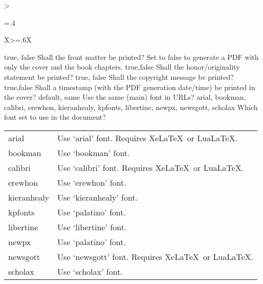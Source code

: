 {\begin{xltabular}{\linewidth}{>{\hsize=.4\hsize\raggedright\arraybackslash}X>{\hsize=.6\hsize}X}
	    \midrule
  	  	{true, \newline false}%
	    {Shall the front matter be printed?}%
		{Set to false to generate a PDF with only the cover and the book chapters.}
	    \midrule
  	  	{true,\newline false }%
	    {Shall the honor/originality statement be printed?}%
		{}
	    \midrule
  	  	{true, \newline false}%
	    {Shall the copyright message be printed?}%
		{}
	    \midrule
  	  	{true,\newline false}%
	    {Shall a timestamp (with the PDF generation date/time) be printed in the cover?}%
		{%
		}
	    \midrule
  	  	{default, \newline same}%
	    {Use the same (main) font in URLs?}%
		{}
    \midrule
    {arial, bookman, calibri, erewhon, kieranhealy, kpfonts, libertine, newpx, newsgott, scholax}%
    {Which font set to use in the document?}%
	{%
    \begin{tabular}{@{}l@{ $\rightarrow$ }X@{}}
		arial 		& Use `arial' font. Requires Xe\LaTeX\ or Lua\LaTeX.\\
		bookman 	& Use `bookman' font.\\
		calibri 	& Use `calibri' font. Requires Xe\LaTeX\ or Lua\LaTeX.\\
		erewhon 	& Use `erewhon' font.\\
		kieranhealy & Use `kieranhealy' font.\\
		kpfonts 	& Use `palatino' font.\\
		libertine 	& Use `libertine' font.\\
		newpx 		& Use `palatino' font. \\
		newsgott 	& Use `newsgott' font. Requires Xe\LaTeX\ or Lua\LaTeX.\\
		scholax 	& Use `scholax' font.\\

\end{tabular}}
\end{xltabular}}
